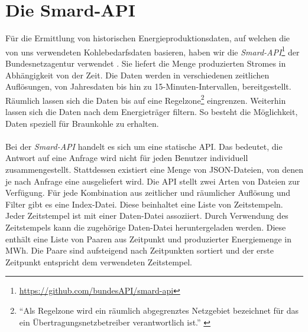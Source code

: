 \section{Die Smard-API}

Für die Ermittlung von historischen Energieproduktionsdaten, auf welchen die von uns verwendeten Kohlebedarfsdaten basieren, haben wir die \emph{Smard-API}\footnote{\url{https://github.com/bundesAPI/smard-api}} der Bundesnetzagentur verwendet \cite{noauthor_bundesapismard-api_nodate}. Sie liefert die Menge produzierten Stromes in Abhängigkeit von der Zeit. Die Daten werden in verschiedenen zeitlichen Auflösungen, von Jahresdaten bis hin zu 15-Minuten-Intervallen, bereitgestellt. Räumlich lassen sich die Daten bis auf eine Regelzone\footnote{\enquote{Als Regelzone wird ein räumlich abgegrenztes Netzgebiet bezeichnet für das ein Übertragungsnetzbetreiber verantwortlich ist.} \cite{noauthor_smard_nodate}} eingrenzen. Weiterhin lassen sich die Daten nach dem Energieträger filtern. So besteht die Möglichkeit, Daten speziell für Braunkohle zu erhalten.\\
\\
Bei der \emph{Smard-API} handelt es sich um eine statische API. Das bedeutet, die Antwort auf eine Anfrage wird nicht für jeden Benutzer individuell zusammengestellt. Stattdessen existiert eine Menge von JSON-Dateien, von denen je nach Anfrage eine ausgeliefert wird. Die API stellt zwei Arten von Dateien zur Verfügung. Für jede Kombination aus zeitlicher und räumlicher Auflösung und Filter gibt es eine Index-Datei. Diese beinhaltet eine Liste von Zeitstempeln. Jeder Zeitstempel ist mit einer Daten-Datei assoziiert. Durch Verwendung des Zeitstempels kann die zugehörige Daten-Datei heruntergeladen werden. Diese enthält eine Liste von Paaren aus Zeitpunkt und produzierter Energiemenge in MWh. Die Paare sind aufsteigend nach Zeitpunkten sortiert und der erste Zeitpunkt entspricht dem verwendeten Zeitstempel.